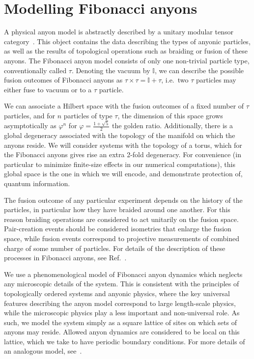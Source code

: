 \documentclass[a4paper,nofootinbib,superscriptaddress]{revtex4}
\begin{document}
\section{Modelling Fibonacci anyons}\label{s:model}

	A physical anyon model is abstractly described by a unitary modular tensor category~\cite{?}. This object contains the data describing the types of anyonic particles, as well as the results of topological operations such as braiding or fusion of these anyons. The Fibonacci anyon model consists of only one non-trivial particle type, conventionally called $\tau$. Denoting the vacuum by $\mathbb{I}$, we can describe the possible fusion outcomes of Fibonacci anyons as $\tau\times\tau=\mathbb{I}+\tau$, i.e.~two $\tau$ particles may either fuse to vacuum or to a $\tau$ particle.

	We can associate a Hilbert space with the fusion outcomes of a fixed number of $\tau$ particles, and for $n$ particles of type $\tau$, the dimension of this space grows asymptotically as $\varphi^n$ for $\varphi=\frac{1+\sqrt{5}}{2}$ the golden ratio. Additionally, there is a global degeneracy associated with the topology of the manifold on which the anyons reside. We will consider systems with the topology of a torus, which for the Fibonacci anyons gives rise an extra 2-fold degeneracy. For convenience (in particular to minimize finite-size effects in our numerical computations), this global space is the one in which we will encode, and demonstrate protection of, quantum information.
	
	The fusion outcome of any particular experiment depends on the history of the particles, in particular how they have braided around one another. For this reason braiding operations are considered to act unitarily on the fusion space. Pair-creation events should be considered isometries that enlarge the fusion space, while fusion events correspond to projective measurements of combined charge of some number of particles. For details of the description of these processes in Fibonacci anyons, see Ref.~\cite{?}.

	We use a phenomenological model of Fibonacci anyon dynamics which neglects any microscopic details of the system. This is consistent with the principles of topologically ordered systems and anyonic physics, where the key universal features describing the anyon model correspond to large length-scale physics, while the microscopic physics play a less important and non-universal role. As such, we model the system simply as a square lattice of sites on which sets of anyons may reside. Allowed anyon dynamics are considered to be local on this lattice, which we take to have periodic boundary conditions. For more details of an analogous model, see~\cite{Brell2013}.
\end{document}
